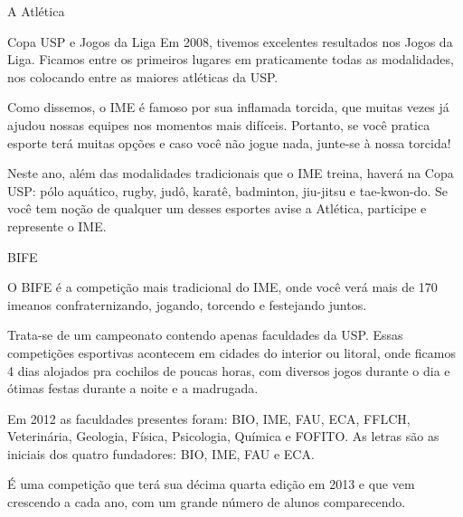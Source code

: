 \begin{secao}{A Atlética}
\begin{subsecao}{Copa USP e Jogos da Liga}
Em 2008, tivemos excelentes resultados nos Jogos da Liga. Ficamos entre os
primeiros lugares em praticamente todas as modalidades, nos colocando entre as
maiores atléticas da USP.

Como dissemos, o IME é famoso por sua inflamada torcida, que muitas vezes já
ajudou nossas equipes nos momentos mais difíceis. Portanto, se você pratica
esporte terá muitas opções e caso você não jogue nada, junte-se à nossa torcida!

Neste ano, além das modalidades tradicionais que o IME treina, haverá na Copa 
USP: pólo aquático, rugby, judô, karatê, badminton, jiu-jitsu e tae-kwon-do. Se 
você tem noção de qualquer um desses esportes avise a Atlética, participe e 
represente o IME.

\end{subsecao}
\begin{subsecao}{BIFE}

O BIFE é a competição mais tradicional do IME, onde você verá mais de 170 
imeanos confraternizando, jogando, torcendo e festejando juntos.

Trata-se de um campeonato contendo apenas faculdades da USP. Essas competições
esportivas acontecem em cidades do interior ou litoral, onde ficamos 4 dias
alojados pra cochilos de poucas horas, com diversos jogos durante o dia e ótimas
festas durante a noite e a madrugada.

Em 2012 as faculdades presentes foram: BIO, IME, FAU, ECA, FFLCH, Veterinária,
Geologia, Física, Psicologia, Química e FOFITO. As letras são as iniciais
dos quatro fundadores: BIO, IME, FAU e ECA.

É uma competição que terá sua décima quarta edição em 2013 e que vem
crescendo a cada ano, com um grande número de alunos comparecendo.


\end{subsecao}
\end{secao}
